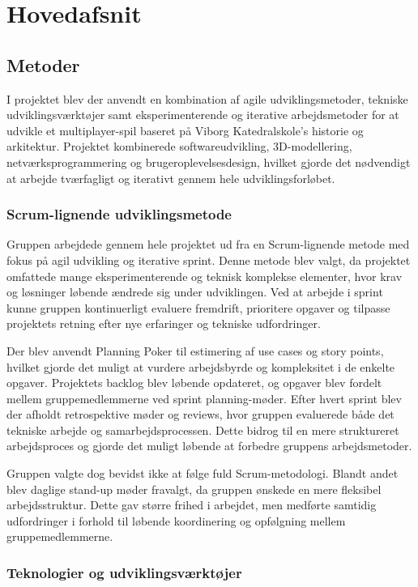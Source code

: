 \section{Hovedafsnit}

\subsection{Metoder}
I projektet blev der anvendt en kombination af agile udviklingsmetoder, tekniske udviklingsværktøjer samt eksperimenterende og iterative arbejdsmetoder for at udvikle et multiplayer-spil baseret på Viborg Katedralskole’s historie og arkitektur. Projektet kombinerede softwareudvikling, 3D-modellering, netværksprogrammering og brugeroplevelsesdesign, hvilket gjorde det nødvendigt at arbejde tværfagligt og iterativt gennem hele udviklingsforløbet.

\subsubsection{Scrum-lignende udviklingsmetode}

Gruppen arbejdede gennem hele projektet ud fra en Scrum-lignende metode med fokus på agil udvikling og iterative sprint. Denne metode blev valgt, da projektet omfattede mange eksperimenterende og teknisk komplekse elementer, hvor krav og løsninger løbende ændrede sig under udviklingen. Ved at arbejde i sprint kunne gruppen kontinuerligt evaluere fremdrift, prioritere opgaver og tilpasse projektets retning efter nye erfaringer og tekniske udfordringer.

Der blev anvendt Planning Poker til estimering af use cases og story points, hvilket gjorde det muligt at vurdere arbejdsbyrde og kompleksitet i de enkelte opgaver. Projektets backlog blev løbende opdateret, og opgaver blev fordelt mellem gruppemedlemmerne ved sprint planning-møder. Efter hvert sprint blev der afholdt retrospektive møder og reviews, hvor gruppen evaluerede både det tekniske arbejde og samarbejdsprocessen. Dette bidrog til en mere struktureret arbejdsproces og gjorde det muligt løbende at forbedre gruppens arbejdsmetoder.

Gruppen valgte dog bevidst ikke at følge fuld Scrum-metodologi. Blandt andet blev daglige stand-up møder fravalgt, da gruppen ønskede en mere fleksibel arbejdsstruktur. Dette gav større frihed i arbejdet, men medførte samtidig udfordringer i forhold til løbende koordinering og opfølgning mellem gruppemedlemmerne.

\subsubsection{Teknologier og udviklingsværktøjer}

